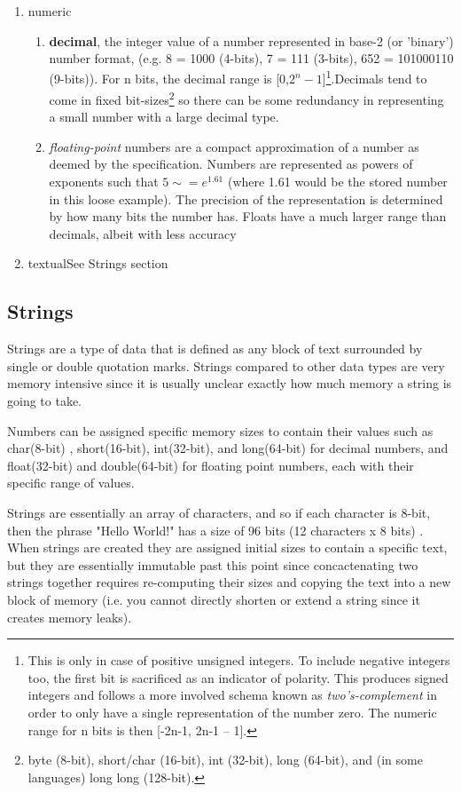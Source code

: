 \begin{enumerate}
\item{numeric
	\begin{enumerate}
	\item{\textbf{decimal}, the integer value of a number represented in base-2 (or 'binary') number format, (e.g. 8 = 1000 (4-bits), 7 = 111 (3-bits), 652 = 101000110 (9-bits)). For n bits, the decimal range is [0,$2^n - 1$]\footnote{This is only in case of positive unsigned integers. To include negative integers too, the first bit is sacrificed as an indicator of polarity. This produces signed integers and follows a more involved schema known as \textit{two's-complement} in order to only have a single representation of the number zero. The numeric range for n bits is then [-2n-1, 2n-1 – 1].}.Decimals tend to come in fixed bit-sizes\footnote{byte (8-bit), short/char (16-bit), int (32-bit), long (64-bit), and (in some languages) long long (128-bit).} so there can be some redundancy in representing a small number with a large decimal type.}
	\item{\textit{floating-point} numbers are a compact approximation of a number as deemed by the specification\citep{floats}. Numbers are represented as powers of exponents such that $5 \sim= e^{1.61}$ (where 1.61 would be the stored number in this loose example). The precision of the representation is determined by how many bits the number has. Floats have a much larger range than decimals, albeit with less accuracy}
	\end{enumerate}
}
\item{textual}{See Strings section}
\end{enumerate}


\subsection{Strings}\label{ref:app:strings}
Strings are a type of data that is defined as any block of text surrounded by single or double quotation marks. Strings compared to other data types are very memory intensive since it is usually unclear exactly how much memory a string is going to take.

Numbers can be assigned specific memory sizes to contain their values such as char(8-bit) , short(16-bit), int(32-bit), and long(64-bit) for decimal numbers, and float(32-bit) and double(64-bit) for floating point numbers, each with their specific range of values.

Strings are essentially an array of characters, and so if each character is 8-bit, then the phrase "Hello World!" has a size of 96 bits (12 characters x 8 bits) . When strings are created they are assigned initial sizes to contain a specific text, but they are essentially immutable past this point since concactenating two strings together requires re-computing their sizes and copying the text into a new block of memory (i.e. you cannot directly shorten or extend a string since it creates memory leaks).

